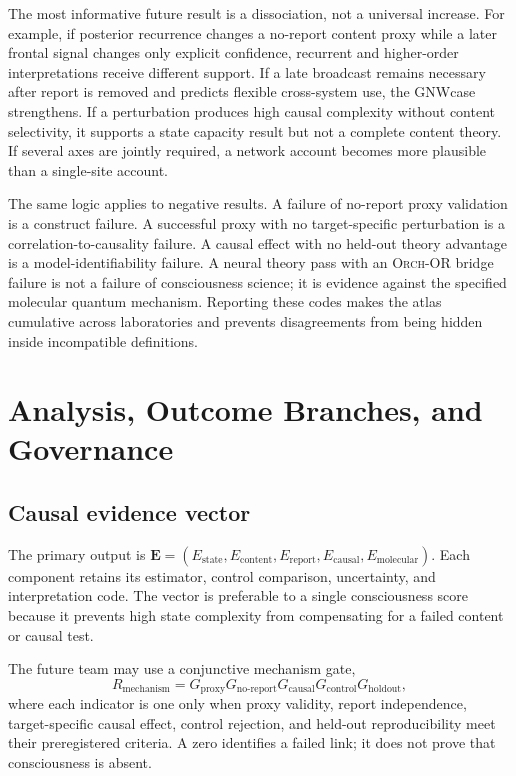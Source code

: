 \documentclass[conference]{IEEEtran}
\newcommand{\GNW}{\textsc{GNW}}
\newcommand{\ORCH}{\textsc{Orch-OR}}
\begin{document}
The most informative future result is a dissociation, not a universal increase. For example, if posterior recurrence changes a no-report content proxy while a later frontal signal changes only explicit confidence, recurrent and higher-order interpretations receive different support. If a late broadcast remains necessary after report is removed and predicts flexible cross-system use, the \GNW case strengthens. If a perturbation produces high causal complexity without content selectivity, it supports a state capacity result but not a complete content theory. If several axes are jointly required, a network account becomes more plausible than a single-site account.

The same logic applies to negative results. A failure of no-report proxy validation is a construct failure. A successful proxy with no target-specific perturbation is a correlation-to-causality failure. A causal effect with no held-out theory advantage is a model-identifiability failure. A neural theory pass with an \ORCH{} bridge failure is not a failure of consciousness science; it is evidence against the specified molecular quantum mechanism. Reporting these codes makes the atlas cumulative across laboratories and prevents disagreements from being hidden inside incompatible definitions.

\section{Analysis, Outcome Branches, and Governance}

\subsection{Causal evidence vector}

The primary output is $\mathbf{E}=(E_{\mathrm{state}},E_{\mathrm{content}},E_{\mathrm{report}},E_{\mathrm{causal}},E_{\mathrm{molecular}})$. Each component retains its estimator, control comparison, uncertainty, and interpretation code. The vector is preferable to a single consciousness score because it prevents high state complexity from compensating for a failed content or causal test.

The future team may use a conjunctive mechanism gate,
\begin{equation}
R_{\mathrm{mechanism}}=G_{\mathrm{proxy}}G_{\mathrm{no\mbox{-}report}}G_{\mathrm{causal}}G_{\mathrm{control}}G_{\mathrm{holdout}},
\label{eq:mechanismgate}
\end{equation}
where each indicator is one only when proxy validity, report independence, target-specific causal effect, control rejection, and held-out reproducibility meet their preregistered criteria. A zero identifies a failed link; it does not prove that consciousness is absent.
\end{document}
